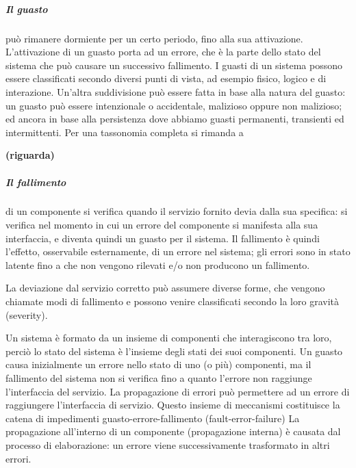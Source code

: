 \documentclass[14pt]{extarticle}
\begin{document}
\subparagraph{Il guasto} può rimanere dormiente per un certo periodo, fino alla sua attivazione. L'attivazione di un guasto porta ad un errore, che è la parte dello
stato del sistema che può causare un successivo fallimento. 
I guasti di un sistema possono essere classificati secondo diversi punti di vista, ad esempio
fisico, logico e di interazione. Un'altra suddivisione può essere fatta in base
alla natura del guasto: un guasto può essere intenzionale o accidentale, malizioso oppure non malizioso; ed ancora in base alla persistenza dove abbiamo
guasti permanenti, transienti ed intermittenti. Per una tassonomia completa
si rimanda a \cite{avizienis2004basic} 

\textbf{(riguarda)}
\subparagraph{Il fallimento} di un componente si verifica quando il servizio fornito devia
dalla sua specifica: si verifica nel momento in cui un errore del componente
si manifesta alla sua interfaccia, e diventa quindi un guasto per il sistema. Il
fallimento è quindi l'effetto, osservabile esternamente, di un errore nel sistema; gli errori sono in stato latente fino a che non vengono rilevati e/o non
producono un fallimento.

La deviazione dal servizio corretto può assumere diverse forme, che vengono chiamate modi di fallimento e possono venire classificati secondo la loro
gravità (severity).

Un sistema è formato da un insieme di componenti che interagiscono tra
loro, perciò lo stato del sistema è l'insieme degli stati dei suoi componenti. Un
guasto causa inizialmente un errore nello stato di uno (o più) componenti, ma
il fallimento del sistema non si verifica fino a quanto l'errore non raggiunge l'interfaccia del servizio. La propagazione di errori può permettere ad un errore
di raggiungere l'interfaccia di servizio. Questo insieme di meccanismi costituisce la catena di impedimenti guasto-errore-fallimento (fault-error-failure)
La propagazione all'interno di un componente (propagazione interna) è
causata dal processo di elaborazione: un errore viene successivamente trasformato in altri errori.
\end{document}
